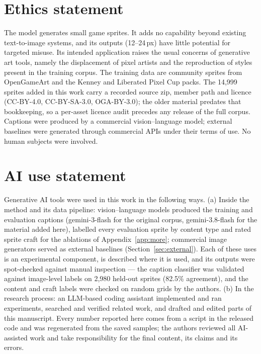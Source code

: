 \documentclass{article} %
\begin{document}
\section*{Ethics statement}
The model generates small game sprites. It adds no capability beyond existing text-to-image systems, and its outputs
(12--24\,px) have little potential for targeted misuse. Its intended application raises the usual concerns of generative
art tools, namely the displacement of pixel artists and the reproduction of styles present in the training corpus. The
training data are community sprites from OpenGameArt and the Kenney and Liberated Pixel Cup packs. The 14{,}999 sprites
added in this work carry a recorded source zip, member path and licence (CC-BY-4.0, CC-BY-SA-3.0, OGA-BY-3.0); the older
material predates that bookkeeping, so a per-asset licence audit precedes any release of the full corpus. Captions were
produced by a commercial vision--language model; external baselines were generated through commercial APIs under their
terms of use. No human subjects were involved.

\section*{AI use statement}
Generative AI tools were used in this work in the following ways. (a) Inside the method and its data pipeline:
vision--language models produced the training and evaluation captions (gemini-3-flash \citep{Gemini3} for the original corpus,
gemini-3.8-flash \citep{Gemini38} for the material added here), labelled every evaluation sprite by content type and rated sprite craft
for the ablations of Appendix~\ref{app:more}; commercial image generators served as external baselines
(Section~\ref{sec:external}). Each of these uses is an experimental component, is described where it is used, and its
outputs were spot-checked against manual inspection --- the caption classifier was validated against image-level labels
on 2{,}980 held-out sprites (82.5\% agreement), and the content and craft labels were checked on random grids by the
authors. (b) In the research process: an LLM-based coding assistant implemented and ran experiments, searched and
verified related work, and drafted and edited parts of this manuscript. Every number reported here comes from a script
in the released code and was regenerated from the saved samples; the authors reviewed all AI-assisted work and take
responsibility for the final content, its claims and its errors.




\appendix

\end{document}
